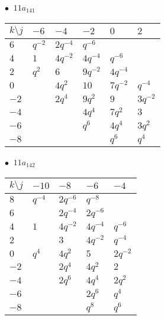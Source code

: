 \begin{minipage}{\linewidth}
$\bullet\ $ $11a_{141}$ \vspace{0.5em} \\
\begin{tabular}{l|lllll}
$k \setminus j$ & $-6$ & $-4$ & $-2$ & $0$ & $2$ \\
\hline
$6$ & $q^{-2}$ & $2q^{-4}$ & $q^{-6}$ &  &  \\
$4$ & $1$ & $4q^{-2}$ & $4q^{-4}$ & $q^{-6}$ &  \\
$2$ & $q^{2}$ & $6$ & $9q^{-2}$ & $4q^{-4}$ &  \\
$0$ &  & $4q^{2}$ & $10$ & $7q^{-2}$ & $q^{-4}$ \\
$-2$ &  & $2q^{4}$ & $9q^{2}$ & $9$ & $3q^{-2}$ \\
$-4$ &  &  & $4q^{4}$ & $7q^{2}$ & $3$ \\
$-6$ &  &  & $q^{6}$ & $4q^{4}$ & $3q^{2}$ \\
$-8$ &  &  &  & $q^{6}$ & $q^{4}$ \\
\end{tabular}
\vspace{2em}
\end{minipage}
%
\begin{minipage}{\linewidth}
$\bullet\ $ $11a_{142}$ \vspace{0.5em} \\
\begin{tabular}{l|llll}
$k \setminus j$ & $-10$ & $-8$ & $-6$ & $-4$ \\
\hline
$8$ & $q^{-4}$ & $2q^{-6}$ & $q^{-8}$ &  \\
$6$ &  & $2q^{-4}$ & $2q^{-6}$ &  \\
$4$ & $1$ & $4q^{-2}$ & $4q^{-4}$ & $q^{-6}$ \\
$2$ &  & $3$ & $4q^{-2}$ & $q^{-4}$ \\
$0$ & $q^{4}$ & $4q^{2}$ & $5$ & $2q^{-2}$ \\
$-2$ &  & $2q^{4}$ & $4q^{2}$ & $2$ \\
$-4$ &  & $2q^{6}$ & $4q^{4}$ & $2q^{2}$ \\
$-6$ &  &  & $2q^{6}$ & $q^{4}$ \\
$-8$ &  &  & $q^{8}$ & $q^{6}$ \\
\end{tabular}
\vspace{2em}
\end{minipage}
%
